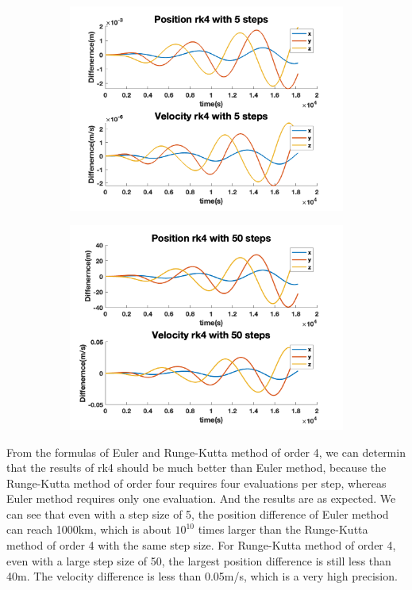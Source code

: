 \documentclass[12pt
,headinclude
,headsepline
,bibtotocnumbered
]{scrartcl}
\begin{document}
\begin{figure}[H]
\begin{subfigure}[b]{0.45\textwidth}
    \includegraphics[width=1\textwidth]{./plots/rk4_5_yprime.png}
    \end{subfigure}
    \begin{subfigure}[b]{0.45\textwidth}
    \includegraphics[width=1\textwidth]{./plots/rk4_50_yprime.png}
    \end{subfigure}
\end{figure}
From the formulas of Euler and Runge-Kutta method of order 4, we can determin that the results of rk4 should be much better than Euler method, because the Runge-Kutta method of order four requires four evaluations per step, whereas Euler method requires only one evaluation. And the results are as expected. We can see that even with a step size of 5, the position difference of Euler method can reach 1000km, which is about $10^10$ times larger than the Runge-Kutta method of order 4 with the same step size. 
For Runge-Kutta method of order 4, even with a large step size of 50, the largest position difference is still less than 40m. The velocity difference is less than 0.05m/s, which is a very high precision.
\end{document}
